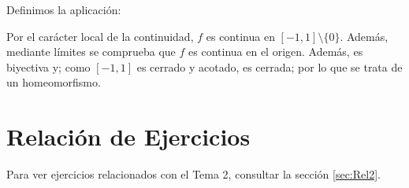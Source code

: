 \begin{ejemplo}
\begin{ejemplo}
\begin{figure}[H]
        \end{figure}

        Definimos la aplicación:

        Por el carácter local de la continuidad, $f$ es continua en $[-1,1]\setminus \{0\}$. Además, mediante límites se comprueba que $f$ es continua en el origen. Además, es biyectiva y; como $[-1,1]$ es cerrado y acotado, es cerrada; por lo que se trata de un homeomorfismo.
    \end{ejemplo}
\end{ejemplo}


\section{Relación de Ejercicios}
Para ver ejercicios relacionados con el Tema 2, consultar la sección \ref{sec:Rel2}.